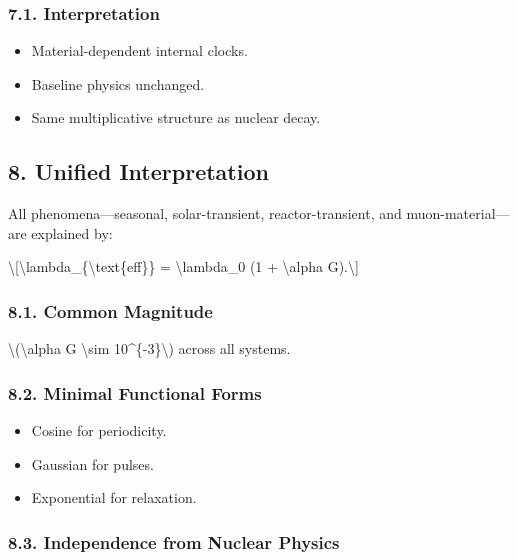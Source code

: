 \documentclass[
  10pt,
]{article}
\providecommand{\tightlist}{%
  \setlength{\itemsep}{0pt}\setlength{\parskip}{0pt}}
\begin{document}
\hypertarget{interpretation-3}{%
\subsubsection{7.1. Interpretation}\label{interpretation-3}}

\begin{itemize}
\tightlist
\item
  Material-dependent internal clocks.
\item
  Baseline physics unchanged.
\item
  Same multiplicative structure as nuclear decay.
\end{itemize}

\hypertarget{unified-interpretation}{%
\subsection{8. Unified Interpretation}\label{unified-interpretation}}

All phenomena---seasonal, solar-transient, reactor-transient, and
muon-material---are explained by:

\textbackslash{[}\textbackslash lambda\_\{\textbackslash text\{eff\}\} =
\textbackslash lambda\_0 (1 + \textbackslash alpha G).\textbackslash{]}

\hypertarget{common-magnitude}{%
\subsubsection{8.1. Common Magnitude}\label{common-magnitude}}

\textbackslash(\textbar\textbackslash alpha G\textbar{}
\textbackslash sim 10\^{}\{-3\}\textbackslash) across all systems.

\hypertarget{minimal-functional-forms}{%
\subsubsection{8.2. Minimal Functional
Forms}\label{minimal-functional-forms}}

\begin{itemize}
\tightlist
\item
  Cosine for periodicity.
\item
  Gaussian for pulses.
\item
  Exponential for relaxation.
\end{itemize}

\hypertarget{independence-from-nuclear-physics}{%
\subsubsection{8.3. Independence from Nuclear
Physics}\label{independence-from-nuclear-physics}}
\end{document}
